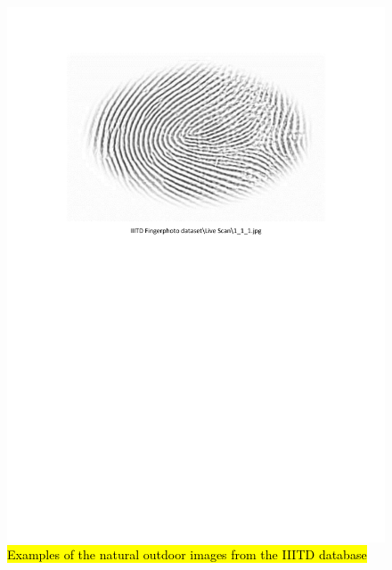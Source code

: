 \documentclass[review]{elsarticle}
\begin{document}
		\begin{figure}[!h]
			\centering
			\includegraphics[page=3,scale=.65,trim=2cm 15cm 2cm 2cm,clip]{IIITD_dataset.pdf}
			\caption{\hl{Examples of the natural outdoor images from the IIITD database}}
			\label{fig:IIITD_Natural_Outdoor}
		\end{figure}
\end{document}
